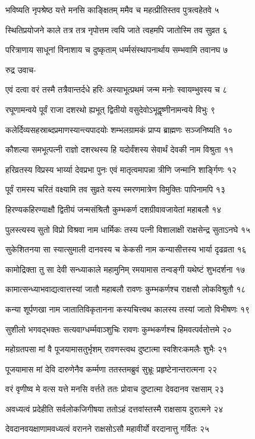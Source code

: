 भविष्यति नृपश्रेष्ठ यत्ते मनसि काङ्क्षितम्
ममैव च महत्प्रीतिस्तव पुत्रत्वहेतवे ५

स्थितिप्रयोजने काले तत्र तत्र नृपोत्तम
त्वयि जाते त्वहमपि जातोस्मि तव सुव्रत ६

परित्राणाय साधूनां विनाशाय च दुष्कृताम्
धर्म्मसंस्थापनार्थाय सम्भवामि तवानघ ७

रुद्र उवाच-

एवं दत्वा वरं तस्मै तत्रैवान्तर्दधे हरिः
अस्याभूत्प्रथमं जन्म मनोः स्वायम्भुवस्य च ८

रघूणामन्वये पूर्वं राजा दशरथो ह्यभूत्
द्वितीयो वसुदेवोऽभूद्वृष्णीनामन्वये विभुः ९

कलेर्दिव्यसहस्राब्दप्रमाणस्यान्त्यपादयोः
शम्भलग्रामकं प्राप्य ब्राह्मणः सञ्जनिष्यति १०

कौशल्या समभूत्पत्नी राज्ञो दशरथस्य हि
यदोर्वंशस्य सेवार्थं देवकी नाम विश्रुता ११

हरिव्रतस्य विप्रस्य भार्य्या देवप्रभा पुनः
एवं मातृत्वमापन्ना त्रीणि जन्मानि शार्ङ्गिणः १२

पूर्वं रामस्य चरितं वक्ष्यामि तव सुव्रते
यस्य स्मरणमात्रेण विमुक्तिः पापिनामपि १३

हिरण्यकहिरण्याक्षौ द्वितीयं जन्मसंश्रितौ
कुम्भकर्ण दशग्रीवावजायेतां महाबलौ १४

पुलस्त्यस्य सुतो विप्रो विश्रवा नाम धार्मिकः
तस्य पत्नी विशालाक्षी राक्षसेन्द्र सुताऽनघे १५

सुकेशितनया सा स्यात्सुमाली दानवस्य च
केकसी नाम कन्यासीत्तस्य भार्या दृढव्रता १६

कामोद्रिक्ता तु सा देवी सन्ध्याकाले महामुनिम्
रमयामास तन्वङ्गी यथेष्टं शुभदर्शना १७

कामात्सन्ध्याभवाद्यत्वात्तस्यां जातौ महाबलौ
रावणः कुम्भकर्णश्च राक्षसौ लोकविश्रुतौ १८

कन्या शूर्पणखा नाम जातातिविकृतानना
कस्यचित्त्वथ कालस्य तस्यां जातो विभीषणः १९

सुशीलो भगवद्भक्तः सत्यवाग्धर्म्मवाञ्शुचिः
रावणः कुम्भकर्णश्च हिमवत्पर्वतोत्तमे २०

महोग्रतपसा मां वै पूजयामासतुर्भृशम्
रावणस्त्वथ दुष्टात्मा स्वशिरःकमलैः शुभैः २१

पूजयामास मां देवि दारुणेनैव कर्म्मणा
ततस्तमब्रुवं सुभ्रूः प्रहृष्टेनान्तरात्मना २२

वरं वृणीष्व मे वत्स यत्ते मनसि वर्त्तते
ततः प्रोवाच दुष्टात्मा देवदानव रक्षसाम् २३

अवध्यत्वं प्रदेहीति सर्वलोकजिगीषया
ततोऽहं दत्तवांस्तस्मै राक्षसाय दुरात्मने २४

देवदानवयक्षाणामवध्यत्वं वरानने
राक्षसोऽसौ महावीर्यो वरदानात्तु गर्वितः २५


